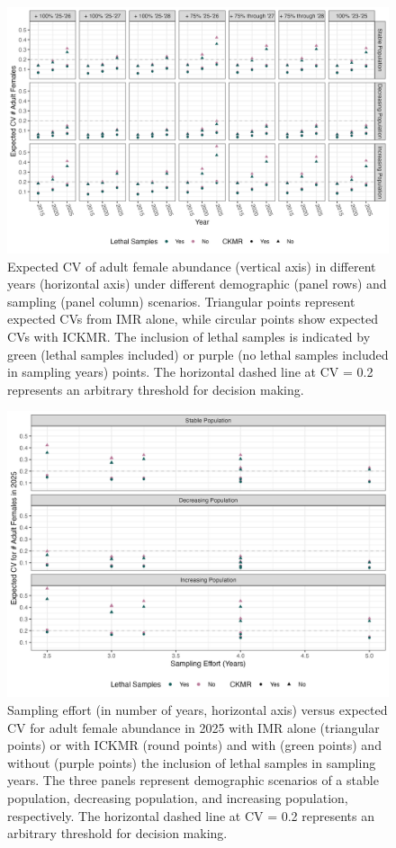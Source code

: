 \begin{figure}
\includegraphics[scale=0.7]{../figures/MegaResults}

\caption{Expected CV of adult female abundance (vertical axis) in different
years (horizontal axis) under different demographic (panel rows) and
sampling (panel column) scenarios. Triangular points represent expected
CVs from IMR alone, while circular points show expected CVs with ICKMR.
The inclusion of lethal samples is indicated by green (lethal samples
included) or purple (no lethal samples included in sampling years)
points. The horizontal dashed line at CV = 0.2 represents an arbitrary
threshold for decision making.\label{fig:megaCV}}
\end{figure}

\begin{figure}
\includegraphics{../figures/EffortVCV}

\caption{Sampling effort (in number of years, horizontal axis) versus expected
CV for adult female abundance in 2025 with IMR alone (triangular points)
or with ICKMR (round points) and with (green points) and without (purple
points) the inclusion of lethal samples in sampling years. The three
panels represent demographic scenarios of a stable population, decreasing
population, and increasing population, respectively. The horizontal
dashed line at CV = 0.2 represents an arbitrary threshold for decision
making.\label{fig:effVcv}}
\end{figure}

